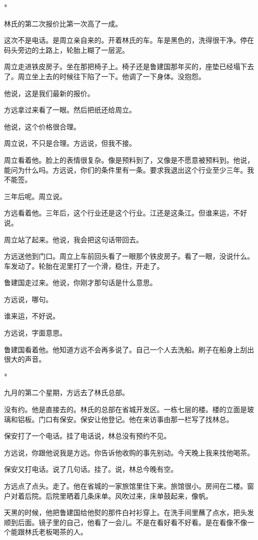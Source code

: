 \documentclass[UTF8,a5paper,11pt,openany]{ctexbook}
\newcommand{\scene}{\vspace{1em}\begin{center}*\quad*\quad*\end{center}\vspace{0.5em}}
\begin{document}
\scene

林氏的第二次报价比第一次高了一成。

这次不是电话。是周立亲自来的。开着林氏的车。车是黑色的，洗得很干净。停在码头旁边的土路上，轮胎上糊了一层泥。

周立走进铁皮房子。坐在那把椅子上。椅子还是鲁建国那年买的，座垫已经塌下去了。周立坐上去的时候往下陷了一下。他调了一下身体。没抱怨。

他说，这是我们最新的报价。

方远拿过来看了一眼。然后把纸还给周立。

他说，这个价格很合理。

周立说，不只是合理。方远说，但我不接。

周立看着他。脸上的表情很复杂。像是预料到了，又像是不愿意被预料到。他说，能问为什么吗。方远说，你们的条件里有一条。要求我退出这个行业至少三年。我不能签。

三年后呢。周立说。

方远看着他。三年后，这个行业还是这个行业。江还是这条江。但谁来运，不好说。

周立站了起来。他说，我会把这句话带回去。

方远送他到门口。周立上车前回头看了一眼那个铁皮房子。看了一眼，没说什么。车发动了。轮胎在泥里打了一个滑，稳住，开走了。

鲁建国走过来。他说，你刚才那句话是什么意思。

方远说，哪句。

谁来运，不好说。

方远说，字面意思。

鲁建国看着他。他知道方远不会再多说了。自己一个人去洗船。刷子在船身上刮出很大的声音。


\scene

九月的第二个星期，方远去了林氏总部。

没有约。他是直接去的。林氏的总部在省城开发区。一栋七层的楼。楼的立面是玻璃和铝板。门口有保安。保安让他登记。他在来访事由那一栏写了找林总。

保安打了一个电话。挂了电话说，林总没有预约不见。

方远说，你跟他说我是方远。你告诉他收购的事先别动。今天晚上我来找他喝茶。

保安又打电话。说了几句话。挂了。说，林总今晚有空。

方远点了点头。走了。他在省城的一家旅馆里住下来。旅馆很小。房间在二楼。窗户对着后院。后院里晒着几条床单。风吹过来，床单鼓起来，像帆。

天黑的时候，他把鲁建国给他熨的那件白衬衫穿上。在洗手间里蘸了点水，把头发顺到后面。镜子里的自己，他看了一会儿。不是在看好看不好看。是在看像不像一个能跟林氏老板喝茶的人。
\end{document}
